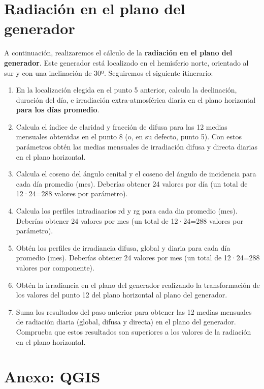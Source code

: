 \documentclass[11pt]{article}
\begin{document}
\clearpage

\section{Radiación en el plano del generador}

A continuación, realizaremos el cálculo de la \textbf{radiación en el plano del generador}. Este generador está localizado en el hemisferio norte, orientado al sur y con una inclinación de 30º. Seguiremos el siguiente itinerario:

\begin{enumerate}
\item En la localización elegida en el punto 5 anterior, calcula la declinación, duración del día, e irradiación extra-atmosférica diaria en el plano horizontal \textbf{para los días promedio}.
\item Calcula el índice de claridad y fracción de difusa para las 12 medias mensuales obtenidas en el punto 8 (o, en su defecto, punto 5). Con estos parámetros obtén las medias mensuales de irradiación difusa y directa diarias en el plano horizontal.
\item Calcula el coseno del ángulo cenital y el coseno del ángulo de incidencia para cada día promedio (mes). Deberías obtener 24 valores por día (un total de 12·24=288 valores por parámetro).
\item Calcula los perfiles intradiaarios rd y rg para cada dia promedio (mes). Deberías obtener 24 valores por mes (un total de 12·24=288 valores por parámetro).
\item Obtén los perfiles de irradiancia difusa, global y diaria para cada día promedio (mes). Deberías obtener 24 valores por mes (un total de 12·24=288 valores por componente).
\item Obtén la irradiancia en el plano del generador realizando la transformación de los valores del punto 12 del plano horizontal al plano del generador.
\item Suma los resultados del paso anterior para obtener las 12 medias mensuales de radiación diaria (global, difusa y directa) en el plano del generador. Comprueba que estos resultados son superiores a los valores de la radiación en el plano horizontal.
\end{enumerate}

\clearpage

\section*{Anexo: QGIS}
\label{sec:orgb85862a}
\end{document}
